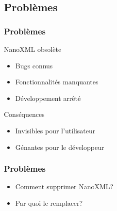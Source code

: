 \subsection{Problèmes}
\begin{frame}\frametitle{Problèmes}
	\begin{beamerboxesrounded}[shadow=true]{NanoXML obsolète}
		\begin{itemize}
		\item Bugs connus
		\item Fonctionnalités manquantes
		\item Développement arrêté
		\end{itemize}
	\end{beamerboxesrounded}
	\vfill
	\begin{beamerboxesrounded}[shadow=true]{Conséquences}
		\begin{itemize}
			\item Invisibles pour l'utilisateur
			\item Génantes pour le développeur	
		\end{itemize}
	\end{beamerboxesrounded}
\end{frame}
\begin{frame}\frametitle{Problèmes}
\begin{itemize}
	\item Comment supprimer NanoXML?
	\item Par quoi le remplacer?
\end{itemize}
\end{frame}
